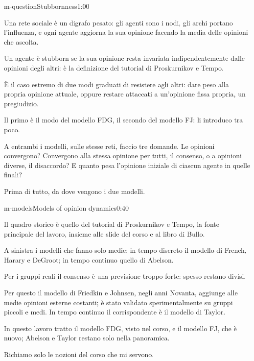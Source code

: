 \begin{slide}{m-question}{Stubbornness}{1:00}
  \begin{discorso}
    \item Una rete sociale è un digrafo pesato: gli agenti sono i nodi, gli archi portano l'influenza, e ogni agente aggiorna la sua opinione facendo la media delle opinioni che ascolta.
    \item Un agente è stubborn se la sua opinione resta invariata indipendentemente dalle opinioni degli altri: è la definizione del tutorial di Proskurnikov e Tempo.
    \item È il caso estremo di due modi graduati di resistere agli altri: dare peso alla propria opinione attuale, oppure restare attaccati a un'opinione fissa propria, un pregiudizio.
    \item Il primo è il modo del modello FDG, il secondo del modello FJ: li introduco tra poco.
    \item A entrambi i modelli, sulle stesse reti, faccio tre domande. Le opinioni convergono? Convergono alla stessa opinione per tutti, il consenso, o a opinioni diverse, il disaccordo? E quanto pesa l'opinione iniziale di ciascun agente in quelle finali?
    \item Prima di tutto, da dove vengono i due modelli.
  \end{discorso}
\end{slide}

\begin{slide}{m-models}{Models of opinion dynamics}{0:40}
  \begin{discorso}
    \item Il quadro storico è quello del tutorial di Proskurnikov e Tempo, la fonte principale del lavoro, insieme alle slide del corso e al libro di Bullo.
    \item A sinistra i modelli che fanno solo medie: in tempo discreto il modello di French, Harary e DeGroot; in tempo continuo quello di Abelson.
    \item Per i gruppi reali il consenso è una previsione troppo forte: spesso restano divisi.
    \item Per questo il modello di Friedkin e Johnsen, negli anni Novanta, aggiunge alle medie opinioni esterne costanti; è stato validato sperimentalmente su gruppi piccoli e medi. In tempo continuo il corrispondente è il modello di Taylor.
    \item In questo lavoro tratto il modello FDG, visto nel corso, e il modello FJ, che è nuovo; Abelson e Taylor restano solo nella panoramica.
    \item Richiamo solo le nozioni del corso che mi servono.
  \end{discorso}
\end{slide}

